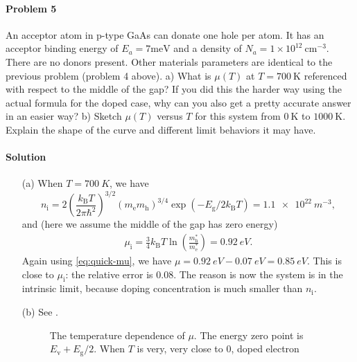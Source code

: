 \documentclass[hyperref, a4paper]{article}
\begin{document}
\paragraph{Problem 5} An acceptor atom in p-type GaAs can donate one hole per atom. It has an acceptor binding energy of $E_a=7 \mathrm{meV}$ and a density of $N_a=1 \times 10^{12} \mathrm{~cm}^{-3}$. There are no donors present. Other materials parameters are identical to the previous problem (problem 4 above).
a) What is $\mu(T)$ at $T=700 \mathrm{~K}$ referenced with respect to the middle of the gap? If you did this the harder way using the actual formula for the doped case, why can you also get a pretty accurate answer in an easier way?
b) Sketch $\mu(T)$ versus $T$ for this system from $0 \mathrm{~K}$ to $1000 \mathrm{~K}$. Explain the shape of the curve and different limit behaviors it may have.

\paragraph{Solution} \begin{itemize}
\item[(a)] When $T = \SI{700}{K}$, we have 
\begin{equation}
    n_{\text{i}} = 2\left(\frac{k_{\mathrm{B}} T}{2 \pi \hbar^2}\right)^{3 / 2}\left(m_{\mathrm{e}} m_{\mathrm{h}}\right)^{3 / 4} \exp \left(-E_{\mathrm{g}} / 2 k_{\mathrm{B}} T\right)
    = \SI{1.1e22}{m^{-3}},
\end{equation}
and (here we assume the middle of the gap has zero energy)
\begin{eqnarray}
    \mu_{\text{i}} = \frac{3}{4} k_{\text{B}} T \ln(\frac{m^*_{\text{h}} }{m^*_{\text{e}}}) = \SI{0.92}{eV}.
\end{eqnarray}
Again using \eqref{eq:quick-mu}, we have $\mu = \SI{0.92}{eV} - \SI{0.07}{eV} = \SI{0.85}{eV}$.
This is close to $\mu_{\text{i}}$: the relative error is 0.08.
The reason is now the system is in the intrinsic limit, 
because doping concentration is much smaller than $n_{\text{i}}$.

\item[(b)] See .

\begin{figure}
    \centering
    
    \caption{The temperature dependence of $\mu$. 
    The energy zero point is $E_{\text{v}} + E_{\text{g}} / 2$.
    When $T$ is very, very close to 0, doped electron }
    \label{fig:semiconductor-limits}
\end{figure}

\end{itemize}
\end{document}
